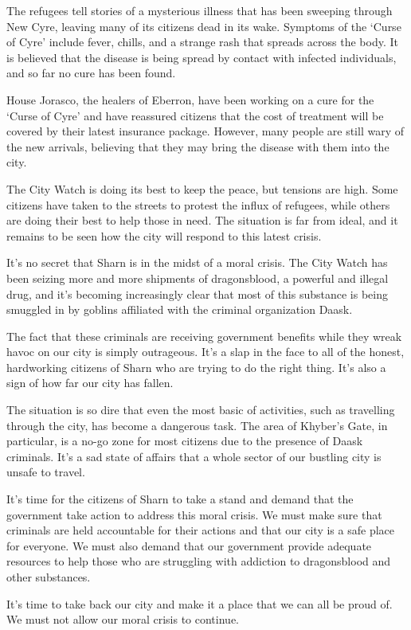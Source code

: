 \documentclass{article}
\begin{document}
\begin{multicols}{3}
The refugees tell stories of a mysterious illness that has been sweeping through New Cyre, leaving many of its citizens dead in its wake. Symptoms of the `Curse of Cyre' include fever, chills, and a strange rash that spreads across the body. It is believed that the disease is being spread by contact with infected individuals, and so far no cure has been found.

House Jorasco, the healers of Eberron, have been working on a cure for the `Curse of Cyre' and have reassured citizens that the cost of treatment will be covered by their latest insurance package. However, many people are still wary of the new arrivals, believing that they may bring the disease with them into the city.

The City Watch is doing its best to keep the peace, but tensions are high. Some citizens have taken to the streets to protest the influx of refugees, while others are doing their best to help those in need. The situation is far from ideal, and it remains to be seen how the city will respond to this latest crisis.

    \closearticle

            




It's no secret that Sharn is in the midst of a moral crisis. The City Watch has been seizing more and more shipments of dragonsblood, a powerful and illegal drug, and it's becoming increasingly clear that most of this substance is being smuggled in by goblins affiliated with the criminal organization Daask.

The fact that these criminals are receiving government benefits while they wreak havoc on our city is simply outrageous. It's a slap in the face to all of the honest, hardworking citizens of Sharn who are trying to do the right thing. It's also a sign of how far our city has fallen.

The situation is so dire that even the most basic of activities, such as travelling through the city, has become a dangerous task. The area of Khyber's Gate, in particular, is a no-go zone for most citizens due to the presence of Daask criminals. It's a sad state of affairs that a whole sector of our bustling city is unsafe to travel.

It's time for the citizens of Sharn to take a stand and demand that the government take action to address this moral crisis. We must make sure that criminals are held accountable for their actions and that our city is a safe place for everyone. We must also demand that our government provide adequate resources to help those who are struggling with addiction to dragonsblood and other substances.

It's time to take back our city and make it a place that we can all be proud of. We must not allow our moral crisis to continue.

    \closearticle

\end{multicols}
\end{document}
